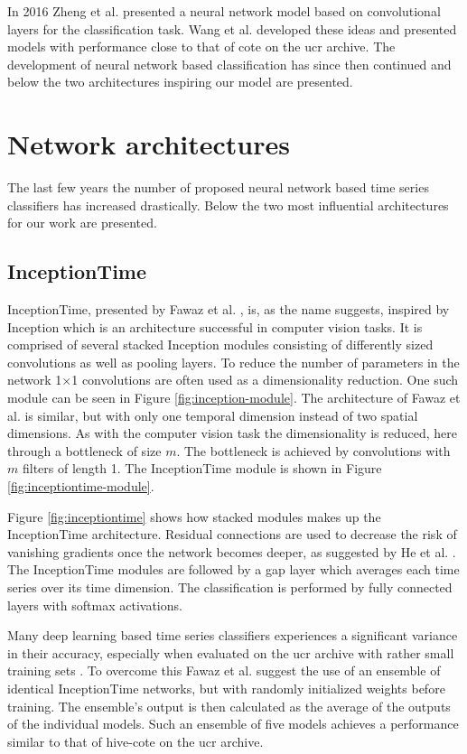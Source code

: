 In 2016 Zheng et al. \cite{Zheng2016} presented a neural network model based on convolutional layers for the classification task. Wang et al. \cite{Wang2017} developed these ideas and presented models with performance close to that of \gls{cote} on the \gls{ucr} archive. The development of neural network based classification has since then continued and below the two architectures inspiring our model are presented.

\section{Network architectures}
The last few years the number of proposed neural network based time series classifiers has increased drastically. Below the two most influential architectures for our work are presented.

\subsection{InceptionTime}
InceptionTime, presented by Fawaz et al. \cite{IsmailFawaz2020}, is, as the name suggests, inspired by Inception \cite{Szegedy2015} which is an architecture successful in computer vision tasks. It is comprised of several stacked Inception modules consisting of differently sized convolutions as well as pooling layers. To reduce the number of parameters in the network 1$\times$1 convolutions are often used as a dimensionality reduction. One such module can be seen in Figure \ref{fig:inception-module}. The architecture of Fawaz et al. is similar, but with only one temporal dimension instead of two spatial dimensions. As with the computer vision task the dimensionality is reduced, here through a bottleneck of size $m$. The bottleneck is achieved by convolutions with $m$ filters of length 1. The InceptionTime module is shown in Figure \ref{fig:inceptiontime-module}.

Figure \ref{fig:inceptiontime} shows how stacked modules makes up the InceptionTime architecture. Residual connections are used to decrease the risk of vanishing gradients once the network becomes deeper, as suggested by He et al. \cite{He2016}. The InceptionTime modules are followed by a \gls{gap} layer which averages each time series over its time dimension. The classification is performed by fully connected layers with softmax activations.

Many deep learning based time series classifiers experiences a significant variance in their accuracy, especially when evaluated on the \gls{ucr} archive with rather small training sets \cite{IsmailFawaz2019ensemble}. To overcome this Fawaz et al. suggest the use of an ensemble of identical InceptionTime networks, but with randomly initialized weights before training. The ensemble's output is then calculated as the average of the outputs of the individual models. Such an ensemble of five models achieves a performance similar to that of \gls{hive-cote} on the \gls{ucr} archive.

